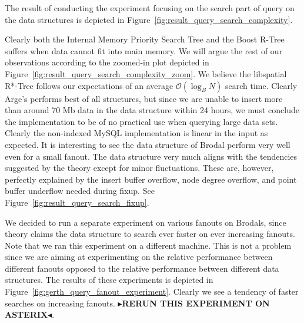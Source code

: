\documentclass[twoside,11pt,openright]{report}
\newcommand{\todo}[1]{{\color[rgb]{.5,0,0}\textbf{$\blacktriangleright$#1$\blacktriangleleft$}}}
\begin{document}
The result of conducting the experiment focusing on the search part of query on the data structures is depicted in Figure~\ref{fig:result_query_search_complexity}.

Clearly both the Internal Memory Priority Search Tree and the Boost R-Tree suffers when data cannot fit into main memory. We will argue the rest of our observations according to the zoomed-in plot depicted in Figure~\ref{fig:result_query_search_complexity_zoom}. We believe the libspatial R*-Tree follows our expectations of an average $\mathcal{O}(\log_B N)$ search time. Clearly Arge's performs best of all structures, but since we are unable to insert more than around 70 Mb data in the data structure within 24 hours, we must conclude the implementation to be of no practical use when querying large data sets. Clearly the non-indexed MySQL implementation is linear in the input as expected. It is interesting to see the data structure of Brodal perform very well even for a small fanout. The data structure very much aligns with the tendencies suggested by the theory except for minor fluctuations. These are, however, perfectly explained by the insert buffer overflow, node degree overflow, and point buffer underflow needed during fixup. See Figure~\ref{fig:result_query_search_fixup}.

We decided to run a separate experiment on various fanouts on Brodals, since theory claims the data structure to search ever faster on ever increasing fanouts.
Note that we ran this experiment on a different machine. This is not a problem since we are aiming at experimenting on the relative performance between different fanouts opposed to the relative performance between different data structures. The results of these experiments is depicted in Figure~\ref{fig:gerth_query_fanout_experiment}.
Clearly we see a tendency of faster searches on increasing fanouts. \todo{RERUN THIS EXPERIMENT ON ASTERIX}.
\end{document}
